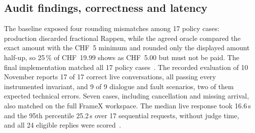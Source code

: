 
\subsection{Audit findings, correctness and latency}
\label{sec:audit-results}

The baseline exposed four rounding mismatches among 17 policy cases: production discarded fractional Rappen, while the agreed oracle compared the exact amount with the CHF~5 minimum and rounded only the displayed amount half-up, so 25\,\% of CHF~19.99 shows as CHF~5.00 but must not be paid. The final implementation matched all 17 policy cases~\citep{h2baseline,h2evaluation}. The recorded evaluation of 10 November reports 17 of 17 correct live conversations, all passing every instrumented invariant, and 9 of 9 dialogue and fault scenarios, two of them expected technical errors. Seven cases, including cancellation and missing arrival, also matched on the full FrameX workspace. The median live response took 16.6\,s and the 95th percentile 25.2\,s over 17 sequential requests, without judge time, and all 24 eligible replies were scored~\citep{h2verification}.
